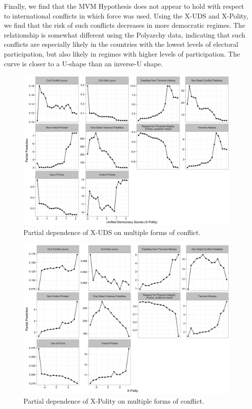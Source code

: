 \documentclass[titlepage, onecolumn,12pt]{article}
\begin{document}
Finally, we find that the MVM Hypothesis does not appear to hold with respect to international conflicts in which force was used.  Using the X-UDS and X-Polity, we find that the risk of such conflicts decreases in more democratic regimes.  The relationship is somewhat different using the Polyarchy data, indicating that such conflicts are especially likely in the countries with the lowest levels of electoral participation, but also likely in regimes with higher levels of participation.  The curve is closer to a U-shape than an inverse-U shape.
\clearpage


\begin{figure}[ht!]
\begin{center}
\includegraphics[width=170mm]{../figures/uds_xpolity.png}
\end{center}
\caption{Partial dependence of X-UDS on multiple forms of conflict.}
\label{xuds}
\end{figure}

\begin{figure}[ht!]
\begin{center}
\includegraphics[width=170mm]{../figures/xpolity_nas.png}
\end{center}
\caption{Partial dependence of X-Polity on multiple forms of conflict.}
\label{xpolity}
\end{figure}
\end{document}
